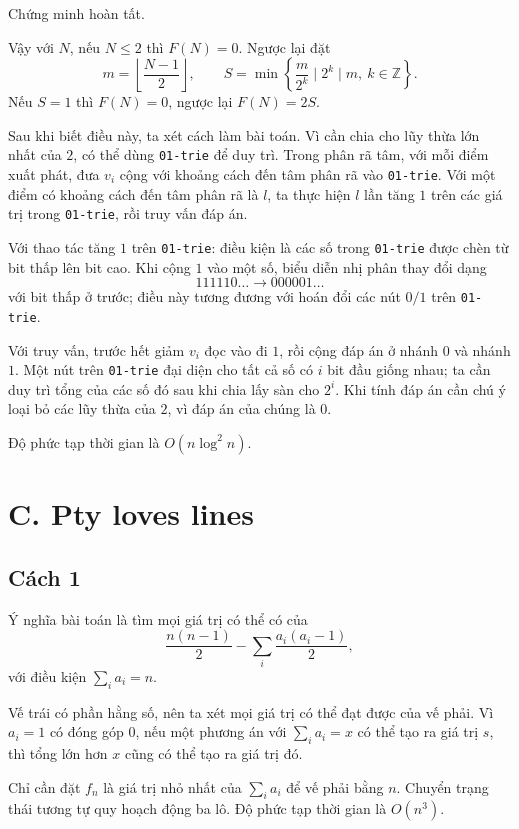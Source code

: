 \documentclass[11pt]{article}
\begin{document}
Chứng minh hoàn tất.

Vậy với $N$, nếu $N\le 2$ thì $F(N)=0$. Ngược lại đặt
\[
  m=\left\lfloor\frac{N-1}{2}\right\rfloor,\qquad
  S=\min\left\{\frac{m}{2^k}\mid 2^k\mid m,\ k\in\mathbb{Z}\right\}.
\]
Nếu $S=1$ thì $F(N)=0$, ngược lại $F(N)=2S$.

Sau khi biết điều này, ta xét cách làm bài toán. Vì cần chia cho lũy thừa
lớn nhất của $2$, có thể dùng \texttt{01-trie} để duy trì. Trong phân rã tâm,
với mỗi điểm xuất phát, đưa $v_i$ cộng với khoảng cách đến tâm phân rã vào
\texttt{01-trie}. Với một điểm có khoảng cách đến tâm phân rã là $l$, ta
thực hiện $l$ lần tăng $1$ trên các giá trị trong \texttt{01-trie}, rồi truy
vấn đáp án.

Với thao tác tăng $1$ trên \texttt{01-trie}: điều kiện là các số trong
\texttt{01-trie} được chèn từ bit thấp lên bit cao. Khi cộng $1$ vào một số,
biểu diễn nhị phân thay đổi dạng
\[
  111110\ldots \to 000001\ldots
\]
với bit thấp ở trước; điều này tương đương với hoán đổi các nút $0/1$ trên
\texttt{01-trie}.

Với truy vấn, trước hết giảm $v_i$ đọc vào đi $1$, rồi cộng đáp án ở nhánh
$0$ và nhánh $1$. Một nút trên \texttt{01-trie} đại diện cho tất cả số có
$i$ bit đầu giống nhau; ta cần duy trì tổng của các số đó sau khi chia lấy
sàn cho $2^i$. Khi tính đáp án cần chú ý loại bỏ các lũy thừa của $2$, vì
đáp án của chúng là $0$.

Độ phức tạp thời gian là $O(n\log^2 n)$.

\section{C. Pty loves lines}

\subsection*{Cách 1}

Ý nghĩa bài toán là tìm mọi giá trị có thể có của
\[
  \frac{n(n-1)}{2}
  -
  \sum_i \frac{a_i(a_i-1)}{2},
\]
với điều kiện $\sum_i a_i=n$.

Vế trái có phần hằng số, nên ta xét mọi giá trị có thể đạt được của vế phải.
Vì $a_i=1$ có đóng góp $0$, nếu một phương án với $\sum_i a_i=x$ có thể tạo
ra giá trị $s$, thì tổng lớn hơn $x$ cũng có thể tạo ra giá trị đó.

Chỉ cần đặt $f_n$ là giá trị nhỏ nhất của $\sum_i a_i$ để vế phải bằng $n$.
Chuyển trạng thái tương tự quy hoạch động ba lô. Độ phức tạp thời gian là
$O(n^3)$.
\end{document}
